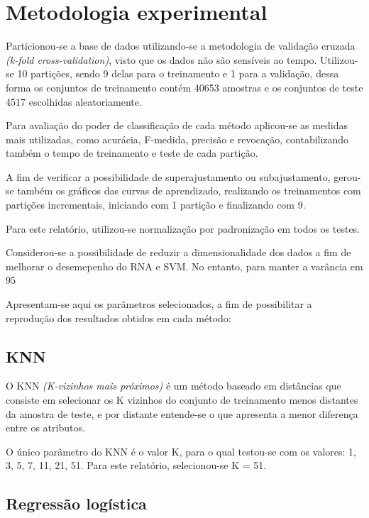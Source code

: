 \section{Metodologia experimental}
\label{sec:metodologia}

Particionou-se a base de dados utilizando-se a metodologia de validação cruzada \emph{(k-fold cross-validation)}, visto que os dados não são sensíveis ao tempo. Utilizou-se 10 partições, sendo 9 delas para o treinamento e 1 para a validação, dessa forma os conjuntos de treinamento contém 40653 amostras e os conjuntos de teste 4517 escolhidas aleatoriamente.

Para avaliação do poder de classificação de cada método aplicou-se as medidas mais utilizadas, como acurácia, F-medida, precisão e revocação, contabilizando também o tempo de treinamento e teste de cada partição.

A fim de verificar a possibilidade de superajustamento ou subajustamento, gerou-se também os gráficos das curvas de aprendizado, realizando os treinamentos com partições incrementais, iniciando com 1 partição e finalizando com 9.

Para este relatório, utilizou-se normalização por padronização em todos os testes.

Considerou-se a possibilidade de reduzir a dimensionalidade dos dados a fim de melhorar o desemepenho do RNA e SVM.  No entanto, para manter a varância em 95%

Apresentam-se aqui os parâmetros selecionados, a fim de possibilitar a reprodução dos resultados obtidos em cada método:

\subsection{KNN}

O KNN \emph{(K-vizinhos mais próximos)} é um método baseado em distâncias que consiste em selecionar os K vizinhos do conjunto de treinamento menos distantes da amostra de teste, e por distante entende-se o que apresenta a menor diferença entre os atributos.

O único parâmetro do KNN é o valor K, para o qual testou-se com os valores: 1, 3, 5, 7, 11, 21, 51. Para este relatório, selecionou-se K = 51.

\subsection{Regressão logística}

